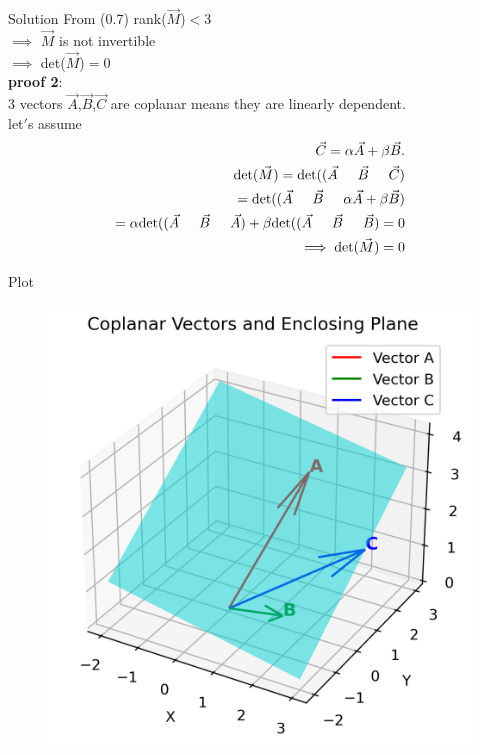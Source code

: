\documentclass{beamer}
\numberwithin{equation}{section}
\theoremstyle{remark}
\begin{document}
\begin{frame}{Solution}
From (0.7)  rank($\Vec{M}$)$<$3 \\
$\implies$ $\Vec{M}$ is not invertible\\
$\implies$ det($\Vec{M}$)$=$0 \\
    \textbf{proof 2}:\\
 3 vectors $\Vec{A}$,$\Vec{B}$,$\Vec{C}$ are coplanar means they are linearly dependent.\\
 let$'$s assume
 \begin{align}
     \Vec{C}=\alpha \Vec{A}+\beta \Vec{B}.\\
     \text{det}(\Vec{M})=\text{det}((\Vec{A} \hspace{0.5cm} \Vec{B} \hspace{0.5cm} \Vec{C})\\
 =\text{det}((\Vec{A} \hspace{0.5cm} \Vec{B} \hspace{0.5cm} \alpha \Vec{A}+\beta \Vec{B})\\
 =\alpha \text{det}((\Vec{A} \hspace{0.5cm} \Vec{B} \hspace{0.5cm} \Vec{A}) + \beta \text{det}((\Vec{A} \hspace{0.5cm} \Vec{B} \hspace{0.5cm} \Vec{B})=0\\
 \implies \text{det}(\Vec{M})=0
 \end{align}
\end{frame}

\begin{frame}{Plot}
    \begin{figure}[H]
    \centering
    \includegraphics[width=0.60\columnwidth]{figs/01.png}
    \label{fig-1}
\end{figure}
\end{frame}
\end{document}
